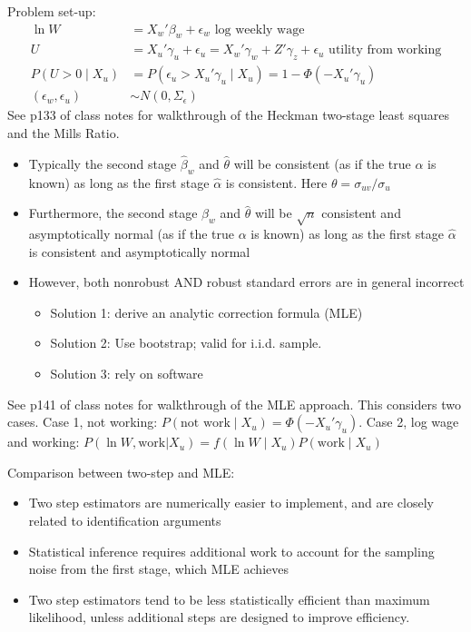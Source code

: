 \documentclass{article}
\begin{document}
Problem set-up:
\begin{align*}
  \ln W &= X_w'\beta_w + \epsilon_w \textrm{ log weekly wage}\\
  U &= X_u'\gamma_u +\epsilon_u = X_w'\gamma_w + Z'\gamma_z + \epsilon_u \textrm{ utility from working}\\
  P(U > 0 \mid X_u) &= P(\epsilon_u > X_u'\gamma_u \mid X_u) = 1 - \Phi(-X_u'\gamma_u)\\
  (\epsilon_w, \epsilon_u) &\sim N(0, \Sigma_\epsilon)
\end{align*}
See p133 of class notes for walkthrough of the Heckman two-stage least squares and the Mills Ratio.
\begin{itemize}
  \item Typically the second stage $\hat{\beta}_w$ and $\hat{\theta}$ will be consistent (as if the true $\alpha$ is known) as long as the first stage $\hat{\alpha}$ is consistent. Here $\theta = \sigma_{uv}/\sigma_u$
  \item Furthermore, the second stage $\hat{\beta}_w$ and $\hat{\theta}$ will be $\sqrt{n}$ consistent and asymptotically normal (as if the true $\alpha$ is known) as long as the first stage $\hat{\alpha}$ is consistent and asymptotically normal
  \item However, both nonrobust AND robust standard errors are in general incorrect
  \begin{itemize}
    \item Solution 1: derive an analytic correction formula (MLE) 
    \item Solution 2: Use bootstrap; valid for i.i.d. sample.
    \item Solution 3: rely on software
  \end{itemize}
\end{itemize}
See p141 of class notes for walkthrough of the MLE approach. This considers two cases. Case 1, not working: $P(\textrm{not work}\mid X_u) = \Phi(-X_u'\gamma_u)$. Case 2, log wage and working: $P(\ln W, \textrm{work} | X_u) = f(\ln W \mid X_u)P(\textrm{work}\mid X_u)$

Comparison between two-step and MLE:
\begin{itemize}
  \item Two step estimators are numerically easier to implement, and are closely
  related to identification arguments
  \item Statistical inference requires additional work to account for the sampling noise from the first stage, which MLE achieves
  \item Two step estimators tend to be less statistically efficient than maximum likelihood, unless additional steps are designed to improve efficiency.
\end{itemize}
\end{document}
